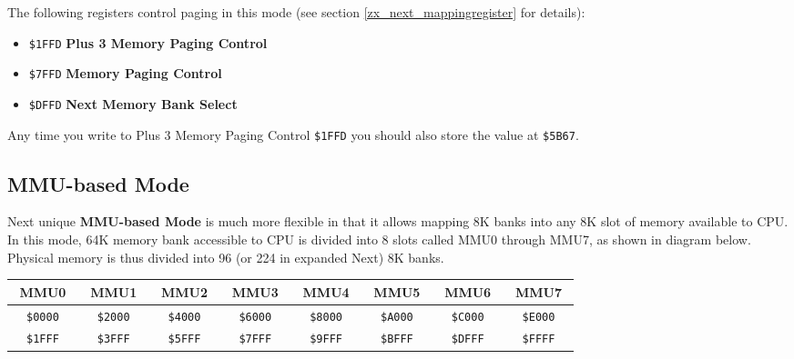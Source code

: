 \documentclass[12pt,twoside,openright,a4paper]{book}
\newcommand{\notet}{\rule{0pt}{2.4ex}}
\newcommand{\noteb}{\rule[-1.3ex]{0pt}{0pt}}
\begin{document}
The following registers control paging in this mode (see section \ref{zx_next_mappingregister} for details):

\begin{itemize}[topsep=1pt,itemsep=1pt]
	\item {\tt \$1FFD} \textbf{Plus 3 Memory Paging Control}
	\item {\tt \$7FFD} \textbf{Memory Paging Control}
	\item {\tt \$DFFD} \textbf{Next Memory Bank Select}
\end{itemize}

Any time you write to Plus 3 Memory Paging Control {\tt \$1FFD} you should also store the value at {\tt \$5B67}.

\pagebreak
\subsection{MMU-based Mode}
\label{zx_next_bank_mmu_mode}

Next unique \textbf{MMU-based Mode} is much more flexible in that it allows mapping 8K banks into any 8K slot of memory available to CPU. In this mode, 64K memory bank accessible to CPU is divided into 8 slots called MMU0 through MMU7, as shown in diagram below. Physical memory is thus divided into 96 (or 224 in expanded Next) 8K banks.

\begingroup
	\setlength{\tabcolsep}{1pt}
	\begin{tabular}{|cccc|cccc|cccc|cccc|cccc|cccc|cccc|cccc|}
		\hline
		\multicolumn{4}{|c}{MMU0}\notet\noteb & 
			\multicolumn{4}{|c}{MMU1} & 
			\multicolumn{4}{|c}{MMU2} & 
			\multicolumn{4}{|c}{MMU3} & 
			\multicolumn{4}{|c}{MMU4} & 
			\multicolumn{4}{|c}{MMU5} & 
			\multicolumn{4}{|c}{MMU6} & 
			\multicolumn{4}{|c|}{MMU7} \\
		\hline
		\colnoline{$\leftarrow$}\notet & \multicolumn{2}{c}{\tt \$0000} & \colnoline{} &
			\colnoline{$\leftarrow$}\notet & \multicolumn{2}{c}{\tt \$2000} & \colnoline{} &
			\colnoline{$\leftarrow$}\notet & \multicolumn{2}{c}{\tt \$4000} & \colnoline{} &
			\colnoline{$\leftarrow$}\notet & \multicolumn{2}{c}{\tt \$6000} & \colnoline{} &
			\colnoline{$\leftarrow$}\notet & \multicolumn{2}{c}{\tt \$8000} & \colnoline{} &
			\colnoline{$\leftarrow$}\notet & \multicolumn{2}{c}{\tt \$A000} & \colnoline{} &
			\colnoline{$\leftarrow$}\notet & \multicolumn{2}{c}{\tt \$C000} & \colnoline{} &
			\colnoline{$\leftarrow$}\notet & \multicolumn{2}{c}{\tt \$E000} & \colnoline{} \\
		\colnoline{} & \multicolumn{2}{c}{\tt \$1FFF} & \colnoline{$\rightarrow$} &
			\colnoline{} & \multicolumn{2}{c}{\tt \$3FFF} & \colnoline{$\rightarrow$} &
			\colnoline{} & \multicolumn{2}{c}{\tt \$5FFF} & \colnoline{$\rightarrow$} &
			\colnoline{} & \multicolumn{2}{c}{\tt \$7FFF} & \colnoline{$\rightarrow$} &
			\colnoline{} & \multicolumn{2}{c}{\tt \$9FFF} & \colnoline{$\rightarrow$} &
			\colnoline{} & \multicolumn{2}{c}{\tt \$BFFF} & \colnoline{$\rightarrow$} &
			\colnoline{} & \multicolumn{2}{c}{\tt \$DFFF} & \colnoline{$\rightarrow$} &
			\colnoline{} & \multicolumn{2}{c}{\tt \$FFFF} & \colnoline{$\rightarrow$} \\
	\end{tabular}
\endgroup
\end{document}
